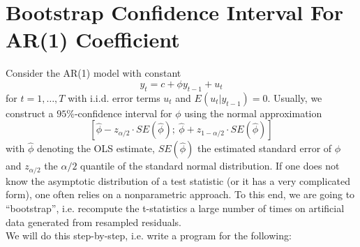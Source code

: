 \documentclass[a4paper]{scrartcl}
\begin{document}
    \newpage
    
    \section[Bootstrap Confidence Interval For AR(1) Coefficient]{Bootstrap Confidence Interval For AR(1) Coefficient}\label{ex:BootstrapCI}
    
    Consider the AR(1) model with constant
    \begin{equation*}
        y_{t}=c +\phi y_{t-1}+u_{t}
    \end{equation*}
    for $t=1,\ldots ,T$ with i.i.d. error terms $u_{t}$ and $E(u_{t}|y_{t-1})=0$.
    Usually, we construct a $95\%$-confidence interval for $\phi$ using the normal approximation
    \begin{equation*}
        \left[ \hat{\phi}-z_{\alpha/2}\cdot SE(\hat{\phi});\ \hat{\phi}+z_{1-\alpha/2}\cdot SE(\hat{\phi})\right]
    \end{equation*}
    with $\hat{\phi}$ denoting the OLS estimate, $SE(\hat{\phi})$ the estimated standard error of $\phi$ and $z_{\alpha/2}$ the $\alpha/2$ quantile of the standard normal distribution. If one does not know the asymptotic distribution of a test statistic (or it has a very complicated form), one often relies on a nonparametric approach. To this end, we are going to \enquote{bootstrap}, i.e. recompute the t-statistics a large number of times on artificial data generated from resampled residuals.\\
    We will do this step-by-step, i.e. write a program for the following:
\end{document}
